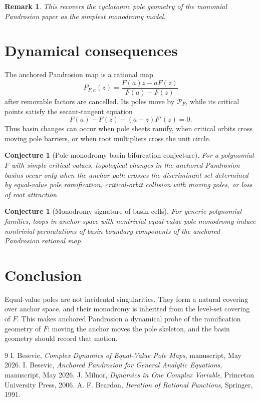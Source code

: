 \documentclass[11pt]{article}
\newtheorem{conjecture}[definition]{Conjecture}
\newtheorem{remark}[definition]{Remark}
\begin{document}
\begin{remark}
This recovers the cyclotomic pole geometry of the monomial Pandrosion paper as the simplest monodromy model.
\end{remark}

\section{Dynamical consequences}

The anchored Pandrosion map is a rational map
\[
        P_{F,a}(z)=\frac{F(a)z-aF(z)}{F(a)-F(z)}
\]
after removable factors are cancelled. Its poles move by \(\mathcal P_F\), while its critical points satisfy the secant-tangent equation
\[
        F(a)-F(z)-(a-z)F'(z)=0.
\]
Thus basin changes can occur when pole sheets ramify, when critical orbits cross moving pole barriers, or when root multipliers cross the unit circle.

\begin{conjecture}[Pole monodromy basin bifurcation conjecture]
For a polynomial \(F\) with simple critical values, topological changes in the anchored Pandrosion basins occur only when the anchor path crosses the discriminant set determined by equal-value pole ramification, critical-orbit collision with moving poles, or loss of root attraction.
\end{conjecture}

\begin{conjecture}[Monodromy signature of basin cells]
For generic polynomial families, loops in anchor space with nontrivial equal-value pole monodromy induce nontrivial permutations of basin boundary components of the anchored Pandrosion rational map.
\end{conjecture}

\section{Conclusion}

Equal-value poles are not incidental singularities. They form a natural covering over anchor space, and their monodromy is inherited from the level-set covering of \(F\). This makes anchored Pandrosion a dynamical probe of the ramification geometry of \(F\): moving the anchor moves the pole skeleton, and the basin geometry should record that motion.

\begin{thebibliography}{9}
I. Besevic, \emph{Complex Dynamics of Equal-Value Pole Maps}, manuscript, May 2026.
I. Besevic, \emph{Anchored Pandrosion for General Analytic Equations}, manuscript, May 2026.
J. Milnor, \emph{Dynamics in One Complex Variable}, Princeton University Press, 2006.
A. F. Beardon, \emph{Iteration of Rational Functions}, Springer, 1991.
\end{thebibliography}
\end{document}
